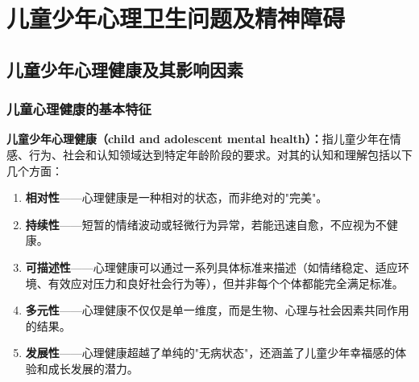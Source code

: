 \chapter{儿童少年心理卫生问题及精神障碍}
\setcounter{chapter}{10}

\section{儿童少年心理健康及其影响因素}

\subsection{儿童心理健康的基本特征}

\begin{defbox}
\textbf{儿童少年心理健康（child and adolescent mental health）：}指儿童少年在情感、行为、社会和认知领域达到特定年龄阶段的要求。对其的认知和理解包括以下几个方面：

\begin{enumerate}[leftmargin=*]
    \item \textbf{相对性}——心理健康是一种相对的状态，而非绝对的"完美"。
    \item \textbf{持续性}——短暂的情绪波动或轻微行为异常，若能迅速自愈，不应视为不健康。
    \item \textbf{可描述性}——心理健康可以通过一系列具体标准来描述（如情绪稳定、适应环境、有效应对压力和良好社会行为等），但并非每个个体都能完全满足标准。
    \item \textbf{多元性}——心理健康不仅仅是单一维度，而是生物、心理与社会因素共同作用的结果。
    \item \textbf{发展性}——心理健康超越了单纯的"无病状态"，还涵盖了儿童少年幸福感的体验和成长发展的潜力。
\end{enumerate}
\end{defbox}

